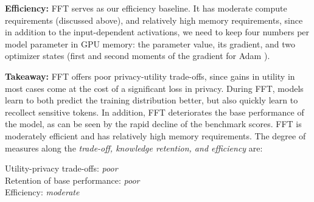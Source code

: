\noindent
\textbf{Efficiency:}
FFT serves as our efficiency baseline.
It has moderate compute requirements (discussed above), and relatively high memory requirements, since in addition to the input-dependent activations, we need to keep four numbers per model parameter in GPU memory: the parameter value, its gradient, and two optimizer states (first and second moments of the gradient for Adam \cite{kingma2014adam}).

\noindent
\textbf{Takeaway:}
FFT offers poor privacy-utility trade-offs, since gains in utility in most cases come at the cost of a significant loss in privacy.
During FFT, models learn to both predict the training distribution better, but also quickly learn to recollect sensitive tokens.
In addition, FFT deteriorates the base performance of the model, as can be seen by the rapid decline of the benchmark scores.
FFT is moderately efficient and has relatively high memory requirements. The degree of measures along the \textit{trade-off, knowledge retention, and efficiency} are: 

\indent Utility-privacy trade-offs: \textit{poor} \\
\indent Retention of base performance: \textit{poor} \\
\indent Efficiency: \textit{moderate}


